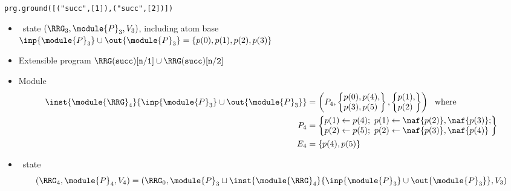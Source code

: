 \begin{frame}{\texttt{prg.ground([("succ",[1]),("succ",[2])])}}
  \begin{itemize}
  \item {} \clingo\ state $(\boldsymbol{\RRG}_3,\module{P}_3,V_3 )$, including atom base
    \\\qquad\quad
    \(
    \inp{\module{P}_3}\cup\out{\module{P}_3}=\{p(0),p(1),p(2),p(3)\}
    \)
  \item {} Extensible program
    \(
    \RRG(\mathtt{succ})[\mathtt{n}/\mathtt{1}]\cup\RRG(\mathtt{succ})[\mathtt{n}/\mathtt{2}]
    \)
  \item<2->  Module
    \begin{align*}
      \inst{\module{\RRG}_4}{\inp{\module{P}_3}\cup\out{\module{P}_3}}
      &=
        \left(
        P_4
        ,
        \left\{
        \begin{array}{@{}l@{}}
          p(0),p(4),
          \\
          p(3),p(5)
        \end{array}
      \right\}
      ,
      \left\{
      \begin{array}{@{}l@{}}
        p(1),\\p(2)
      \end{array}
      \right\}
      \right)
      \ \text{ where}\\
      P_4 & {} =
               \left\{
               \begin{array}{@{}l@{}}
                 p(1)\leftarrow p(4);\ p(1)\leftarrow \naf{p(2)},\naf{p(3)};
                 \\
                 p(2)\leftarrow p(5);\ p(2)\leftarrow \naf{p(3)},\naf{p(4)}
               \end{array}
      \right\}\\
      E_4 & {} = \{p(4),p(5)\}
    \end{align*}
  \item<2->  \clingo\ state
    \[
    (\boldsymbol{\RRG}_4,\module{P}_4,V_4 )
    =
    (\boldsymbol{\RRG}_0,\module{P}_3\sqcup\inst{\module{\RRG}_4}{\inp{\module{P}_3}\cup\out{\module{P}_3}},V_3)
    \]
  \end{itemize}
\end{frame}
